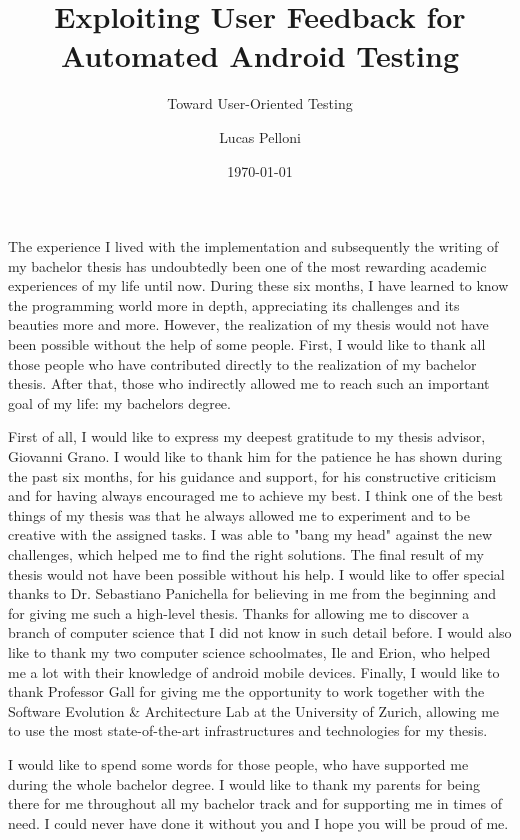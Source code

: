 \documentclass{seal_thesis}
\date{\today}
\title{Exploiting \vspace*{0.1em}User \vspace*{0.1em}Feedback \vspace*{0.1em}for Automated\vspace*{0.2em} Android Testing}
\subtitle{Toward User-Oriented Testing}
\author{Lucas Pelloni}
\begin{document}
\maketitle



\frontmatter




\begin{acknowledgements}
The experience I lived with the implementation and subsequently the writing of my bachelor thesis has undoubtedly been one of the most rewarding academic experiences of my life until now. During these six months, I have learned to know the programming world more in depth, appreciating its challenges and its beauties more and more. However, the realization of my thesis would not have been possible without the help of some people. First, I would like to thank all those people who have contributed directly to the realization of my bachelor thesis. After that, those who indirectly allowed me to reach such an important goal of my life: my bachelors degree. 

First of all, I would like to express my deepest gratitude to my thesis advisor, Giovanni Grano. I would like to thank him for the patience he has shown during the past six months, for his guidance and support, for his constructive criticism and for having always encouraged me to achieve my best. I think one of the best things of my thesis was that he always allowed me to experiment and to be creative with the assigned tasks. I was able to "bang my head" against the new challenges, which helped me to find the right solutions. The final result of my thesis would not have been possible without his help. I would like to offer special thanks to Dr. Sebastiano Panichella for believing in me from the beginning and for giving me such a high-level thesis. Thanks for allowing me to discover a branch of computer science that I did not know in such detail before. I would also like to thank my two computer science schoolmates, Ile and Erion, who helped me a lot with their knowledge of android mobile devices. Finally, I would like to thank Professor Gall for giving me the opportunity to work together with the Software Evolution \& Architecture Lab at the University of Zurich, allowing me to use the most state-of-the-art infrastructures and technologies for my thesis. 

I would like to spend some words for those people, who have supported me during the whole bachelor degree. I would like to thank my parents for being there for me throughout all my bachelor track and for supporting me in times of need. I could never have done it without you and I hope you will be proud of me. 
\end{acknowledgements}
\end{document}
